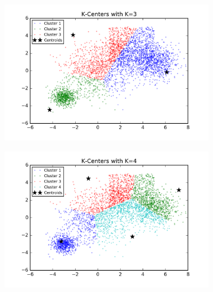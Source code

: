 \begin{description}
\begin{description}
\begin{figure}[!h]
        \centering
        \begin{subfigure}[b]{0.475\textwidth}
            \centering
            \includegraphics[width=\textwidth]{./figures/bigClustering_kCenter_3.png}
        \end{subfigure}
        \hfill
        \begin{subfigure}[b]{0.475\textwidth}  
            \centering 
            \includegraphics[width=\textwidth]{./figures/bigClustering_kCenter_4.png}
        \end{subfigure}
        \begin{subfigure}[b]{0.475\textwidth}  
            \centering 

\end{subfigure}
\end{figure}
\end{description}
\end{description}

